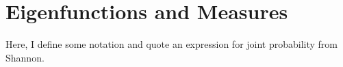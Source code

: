 \documentclass[twocolumn]{article}
\begin{document}
\section{Eigenfunctions and Measures}
\label{sec:eigenfunctions}

Here, I define some notation and quote an expression for joint
probability from Shannon.%
\newcommand{\tuple}[2]{z_{#1}^{#2}}%
\newcommand{\allowed}{\alpha}%
\newcommand{\preimage}{\tau}%
\newcommand{\scale}[1]{\psi_{#1}}%
\newcommand{\stationary}{\mu}%
\newcommand{\pair}{\beta}%
\newcommand{\ptuple}[1]{\gamma_{#1}}%
\newcommand{\Skip}[1]{\delta_{#1}}%
\newcommand{\PFop}{\Phi} %
\newcommand{\pfop}{\phi} %
\newcommand{\lefunc}{\rho_L}%
\newcommand{\refunc}{\rho_R}%
\newcommand{\eval}{\lambda}
\newcommand{\suparg}[1]{^{[#1]}}
\newcommand{\supn}{\suparg{n}}
\end{document}
